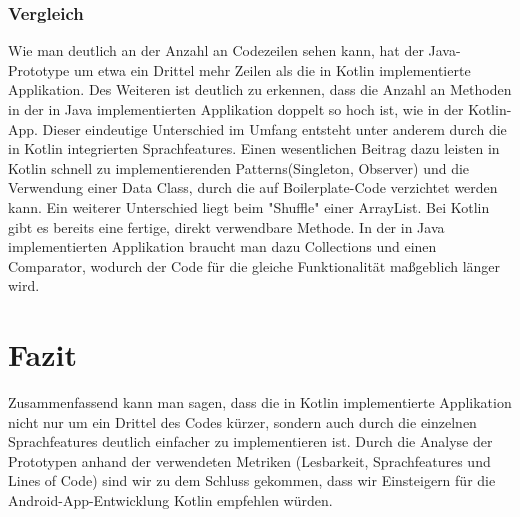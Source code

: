 \documentclass{sigchi-ext}
\begin{document}
\subsubsection{Vergleich}
Wie man deutlich an der Anzahl an Codezeilen sehen kann, hat der Java-Prototype um etwa ein Drittel mehr Zeilen als die in Kotlin implementierte Applikation. Des Weiteren ist deutlich zu erkennen, dass die Anzahl an Methoden in der in Java implementierten Applikation doppelt so hoch ist, wie in der Kotlin-App.
Dieser eindeutige Unterschied im Umfang entsteht unter anderem durch die in Kotlin integrierten Sprachfeatures. Einen wesentlichen Beitrag dazu leisten in Kotlin schnell zu implementierenden Patterns(Singleton, Observer) und die Verwendung einer Data Class, durch die auf Boilerplate-Code verzichtet werden kann.
Ein weiterer Unterschied liegt beim "Shuffle" einer ArrayList. Bei Kotlin gibt es bereits eine fertige, direkt verwendbare Methode. In der in Java implementierten Applikation braucht man dazu Collections und einen Comparator, wodurch der Code für die gleiche Funktionalität maßgeblich länger wird.

\section{Fazit}
Zusammenfassend kann man sagen, dass die in Kotlin implementierte Applikation nicht nur um ein Drittel des Codes kürzer, sondern auch durch die einzelnen Sprachfeatures deutlich einfacher zu implementieren ist.
Durch die Analyse der Prototypen anhand der verwendeten Metriken (Lesbarkeit, Sprachfeatures und Lines of Code) sind wir zu dem Schluss gekommen, dass wir Einsteigern für die Android-App-Entwicklung Kotlin empfehlen würden.

\balance{} 



\end{document}
